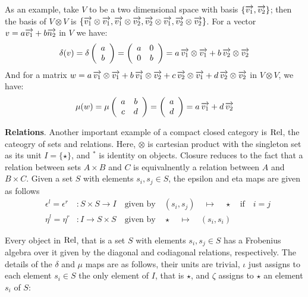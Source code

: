 As an example, take $V$ to be a two dimensional space with
basis $\{\overrightarrow{v_1}, \overrightarrow{v_2}\}$; then the basis of $V \otimes V$ is
$\{\overrightarrow{v_1} \otimes \overrightarrow{v_1}, \overrightarrow{v_1} \otimes \overrightarrow{v_2}, \overrightarrow{v_2}
\otimes \overrightarrow{v_1}, \overrightarrow{v_2} \otimes \overrightarrow{v_2}\}$. For a vector $v = a
\overrightarrow{v_1} + b \overrightarrow{n_2}$ in $V$ we have:
\begingroup
\setlength{\arraycolsep}{2pt}
\[
\delta (v) = \delta \left(\begin{array}{c} a\\b\end{array}\right)
 = 
 \left(\begin{array}{cc} a&0\\0&b\end{array}\right) = a \, \overrightarrow{v_1} \otimes \overrightarrow{v_1} + b \, \overrightarrow{v_2} \otimes \overrightarrow{v_2} 
\]
And for a matrix $w = a \, \overrightarrow{v_1} \otimes \overrightarrow{v_1} + b \, \overrightarrow{v_1}
\otimes \overrightarrow{v_2} + c \, \overrightarrow{v_2} \otimes \overrightarrow{v_1} + d \, \overrightarrow{v_2}
\otimes \overrightarrow{v_2}$ in $V \otimes V$, we have:
\[
\mu (w) = \mu \left(\begin{array}{cc} a&b\\c&d\end{array}\right) = 
\left(\begin{array}{c} a\\d\end{array}\right)
= a \, \overrightarrow{v_1} + d \, \overrightarrow{v_2}
\]
\endgroup

\medskip
\noindent
{\bf Relations}.
Another important example of a  compact closed category is
$\mathrm{Rel}$, the cateogry of sets and relations. Here, $\otimes$ is
cartesian product with the singleton set as its unit $I = \{\star\}$, and $^*$ is identity on objects. Closure reduces to the
fact that a relation between sets $A\times B$ and $C$ is equivalnently
a relation between $A$ and $B \times C$.   Given a set $S$ with elements $s_i, s_j \in S$,  the epsilon and eta maps are
given as follows
\begin{eqnarray*}
&\epsilon^l  =  \epsilon^r &\colon   S \times S \to I \quad \mbox{given by} \quad
(s_i, s_j) \quad \mapsto \quad  \star \quad \text{if} \quad i=j\\
&\eta^l = \eta^r& \colon  I \to S \times S
\quad \mbox{given by} \quad 
\star \quad \mapsto \quad (s_i, s_i)
\end{eqnarray*}



Every object in $\mathrm{Rel}$, that is a set $S$ with elements $s_i, s_j \in S$  has a
Frobenius algebra over it given by the diagonal and codiagonal
relations, respectively. The details of the $\delta$ and $\mu$ maps are as follows, their units are trivial, $\iota$  just assigns to each element $s_i \in S$ the only element of $I$, that is $\star$, and $\zeta$ assigns to $\star$ an element $s_i$ of $S$:



